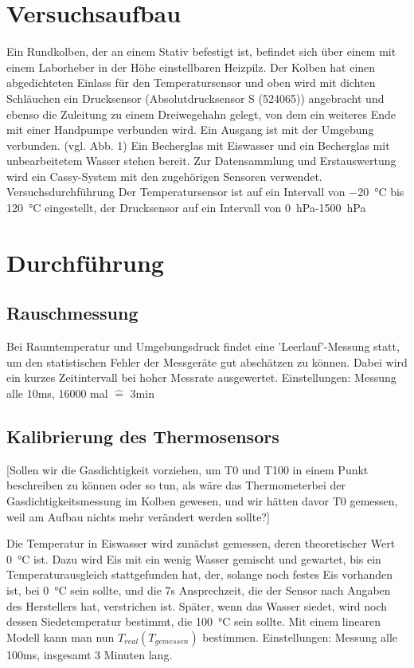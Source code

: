 \documentclass[]{article}
\begin{document}
\section{Versuchsaufbau}
Ein Rundkolben, der an einem Stativ befestigt ist, befindet sich über einem mit einem Laborheber in der Höhe einstellbaren Heizpilz. Der Kolben hat einen abgedichteten Einlass für den Temperatursensor und oben wird mit dichten Schläuchen ein Drucksensor (Absolutdrucksensor S (524065)) angebracht und ebenso die Zuleitung zu einem Dreiwegehahn gelegt, von dem ein weiteres Ende mit einer Handpumpe verbunden wird. Ein Ausgang ist mit der Umgebung verbunden. {\color{red}(vgl. Abb. 1)} Ein Becherglas mit Eiswasser und ein Becherglas mit unbearbeitetem Wasser stehen bereit. Zur Datensammlung und Erstauswertung wird ein Cassy-System mit den zugehörigen Sensoren verwendet.
Versuchsdurchführung
Der Temperatursensor ist auf ein Intervall von \SI{-20}{\celsius} bis \SI{120}{\celsius} eingestellt, der Drucksensor auf ein Intervall von \SI{0}{\hecto\pascal}-\SI{1500}{\hecto\pascal}

\section{Durchführung}
\subsection{Rauschmessung}
Bei Raumtemperatur und Umgebungsdruck findet eine 'Leerlauf'-Messung statt, um den statistischen Fehler der Messgeräte gut abschätzen zu können. Dabei wird ein kurzes Zeitintervall bei hoher Messrate ausgewertet. 
Einstellungen: Messung alle 10ms, 16000 mal $\widehat{=}$ 3min

\subsection {Kalibrierung des Thermosensors}  {\color{red}[Sollen wir die Gasdichtigkeit vorziehen, um T0 und T100 in einem Punkt beschreiben zu können oder so tun, als wäre das Thermometerbei der Gasdichtigkeitsmessung im Kolben gewesen, und wir hätten davor T0 gemessen, weil am Aufbau nichts mehr verändert werden sollte?]}

Die Temperatur in Eiswasser wird zunächst gemessen, deren theoretischer Wert \SI{0}{\celsius} ist. Dazu wird Eis mit ein wenig Wasser gemischt und gewartet, bis ein Temperaturausgleich stattgefunden hat, der, solange noch festes Eis vorhanden ist, bei \SI{0}{\celsius} sein sollte, und die 7s Ansprechzeit, die der Sensor nach Angaben des Herstellers hat, verstrichen ist. Später, wenn das Wasser siedet, wird noch dessen Siedetemperatur bestimmt, die \SI{100}{\celsius} sein sollte. Mit einem linearen Modell kann man nun $T_{real}(T_{gemessen})$ bestimmen.
Einstellungen: Messung alle 100ms, insgesamt 3 Minuten lang.
\end{document}
